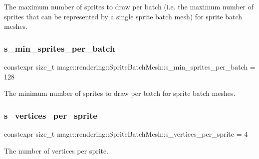 The maximum number of sprites to draw per batch (i.\+e. the maximum number of sprites that can be represented by a single sprite batch mesh) for sprite batch meshes. \hypertarget{classmage_1_1rendering_1_1_sprite_batch_mesh_a5d47763b9a0fa5a58a2894cd2dc4d8f0}{}\label{classmage_1_1rendering_1_1_sprite_batch_mesh_a5d47763b9a0fa5a58a2894cd2dc4d8f0} 
\subsubsection{\texorpdfstring{s\+\_\+min\+\_\+sprites\+\_\+per\+\_\+batch}{s\_min\_sprites\_per\_batch}}
{\footnotesize\ttfamily constexpr size\+\_\+t mage\+::rendering\+::\+Sprite\+Batch\+Mesh\+::s\+\_\+min\+\_\+sprites\+\_\+per\+\_\+batch = 128\hspace{0.3cm}{\ttfamily [static]}}

The minimum number of sprites to draw per batch for sprite batch meshes. \hypertarget{classmage_1_1rendering_1_1_sprite_batch_mesh_ae330e326577d8a0d94c03c0c8aae62c6}{}\label{classmage_1_1rendering_1_1_sprite_batch_mesh_ae330e326577d8a0d94c03c0c8aae62c6} 
\subsubsection{\texorpdfstring{s\+\_\+vertices\+\_\+per\+\_\+sprite}{s\_vertices\_per\_sprite}}
{\footnotesize\ttfamily constexpr size\+\_\+t mage\+::rendering\+::\+Sprite\+Batch\+Mesh\+::s\+\_\+vertices\+\_\+per\+\_\+sprite = 4\hspace{0.3cm}{\ttfamily [static]}}

The number of vertices per sprite. 